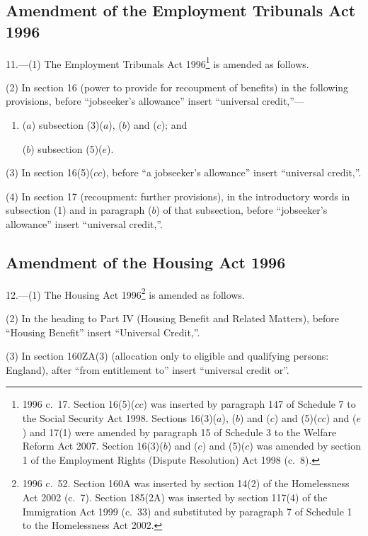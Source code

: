 \documentclass[12pt,a4paper]{article}
\begin{document}
\subsection[11. Amendment of the Employment Tribunals Act 1996]{Amendment of the Employment Tribunals Act 1996}

11.—(1) The Employment Tribunals Act 1996\footnote{1996 c.~17. Section 16(5)($cc$)  was inserted by paragraph 147 of Schedule 7 to the Social Security Act 1998. Sections 16(3)($a$), ($b$) and ($c$) and (5)($cc$)  and ($e$) and 17(1) were amended by paragraph 15 of Schedule 3 to the Welfare Reform Act 2007. Section 16(3)($b$) and ($c$) and (5)($c$) was amended by section 1 of the Employment Rights (Dispute Resolution) Act 1998 (c.~8).} is amended as follows.

(2) In section 16 (power to provide for recoupment of benefits) in the following provisions, before “jobseeker’s allowance” insert “universal credit,”—
\begin{enumerate}\item[]
($a$) subsection (3)($a$), ($b$)  and ($c$); and

($b$) subsection (5)($e$).
\end{enumerate}

(3) In section 16(5)($cc$), before “a jobseeker’s allowance” insert “universal credit,”.

(4) In section 17 (recoupment: further provisions), in the introductory words in subsection (1) and in paragraph ($b$)  of that subsection, before “jobseeker’s allowance” insert “universal credit,”.

\subsection[12. Amendment of the Housing Act 1996]{Amendment of the Housing Act 1996}

12.—(1) The Housing Act 1996\footnote{1996 c.~52. Section 160A was inserted by section 14(2) of the Homelessness Act 2002 (c.~7). Section 185(2A) was inserted by section 117(4) of the Immigration Act 1999 (c.~33) and substituted by paragraph 7 of Schedule 1 to the Homelessness Act 2002.} is amended as follows.

(2) In the heading to Part IV (Housing Benefit and Related Matters), before “Housing Benefit” insert “Universal Credit,”.

(3) In section 160ZA(3) (allocation only to eligible and qualifying persons: England), after “from entitlement to” insert “universal credit or”.
\end{document}
